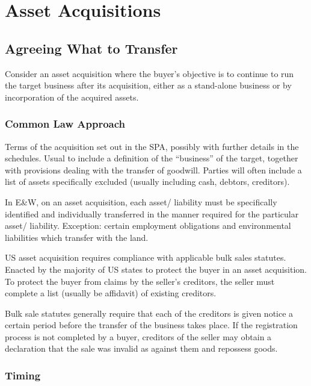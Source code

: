 \documentclass[
]{article}
\author{}
\date{}
\begin{document}
{
\setcounter{tocdepth}{3}
\tableofcontents
}
\hypertarget{asset-acquisitions}{%
\section{Asset Acquisitions}\label{asset-acquisitions}}

\hypertarget{agreeing-what-to-transfer}{%
\subsection{Agreeing What to Transfer}\label{agreeing-what-to-transfer}}

Consider an asset acquisition where the buyer's objective is to continue
to run the target business after its acquisition, either as a
stand-alone business or by incorporation of the acquired assets.

\hypertarget{common-law-approach}{%
\subsubsection{Common Law Approach}\label{common-law-approach}}

Terms of the acquisition set out in the SPA, possibly with further
details in the schedules. Usual to include a definition of the
``business'' of the target, together with provisions dealing with the
transfer of goodwill. Parties will often include a list of assets
specifically excluded (usually including cash, debtors, creditors).

In E\&W, on an asset acquisition, each asset/ liability must be
specifically identified and individually transferred in the manner
required for the particular asset/ liability. Exception: certain
employment obligations and environmental liabilities which transfer with
the land.

US asset acquisition requires compliance with applicable bulk sales
statutes. Enacted by the majority of US states to protect the buyer in
an asset acquisition. To protect the buyer from claims by the seller's
creditors, the seller must complete a list (usually be affidavit) of
existing creditors.

Bulk sale statutes generally require that each of the creditors is given
notice a certain period before the transfer of the business takes place.
If the registration process is not completed by a buyer, creditors of
the seller may obtain a declaration that the sale was invalid as against
them and repossess goods.

\hypertarget{timing}{%
\subsubsection{Timing}\label{timing}}
\end{document}
